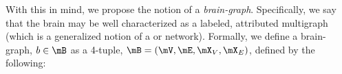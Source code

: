 % 
% 
% 
% 
% 
% 
With this in mind, we propose the notion of a \emph{brain-graph}. Specifically, we say that the brain may be well characterized as a labeled, attributed multigraph (which is a generalized notion of a or network). Formally, we define a brain-graph, $b\in \mB$ as a 4-tuple, $\mB=(\mV,\mE,\mX_V, \mX_E)$, defined by the following:
